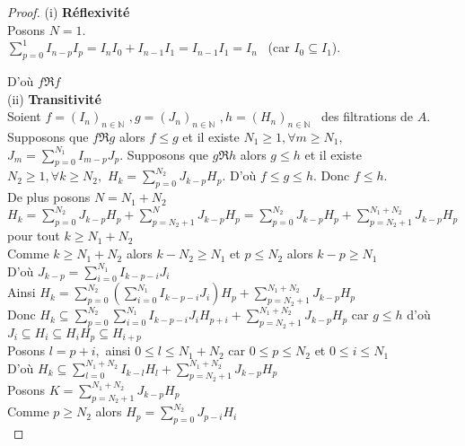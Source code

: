 \begin{proof}
	(i) \textbf{Réflexivité} \\
	Posons $N=1$. \\
	$\displaystyle \sum_{p=0}^{1}I_{n-p}I_{p}=I_{n}I_{0}+I_{n-1}I_{1}=I_{n-1}I_{1}=I_{n}$ \
	(car $I_{0}\subseteq I_{1}$).
	
	D'où $f \Re f$ \\
	(ii) \textbf{Transitivité} \\
	Soient $f=(I_{n})_{n\in \mathbb{N}}$ $,g=(J_{n})_{n\in \mathbb{N}}$ $,h=(H_{n})_{n\in \mathbb{N}}$ \ des filtrations de $A.$ \\
	Supposons que $f \Re g$
	alors $f\leq g$ et il existe $N_{1}\geq 1,\forall m\geq N_{1},$ $J_{m}=\displaystyle  \sum_{p=0}^{N_{1}}I_{m-p}J_{p}$.
	Supposons que $g \Re h$ alors $g\leq h$ et il existe $N_{2}\geq 1,\forall k\geq N_{2},$ $H_{k}=\displaystyle  \sum_{p=0}^{N_{2}}J_{k-p}H_{p}$.
	D'où $f\leq g\leq h.$ Donc $f\leq h$. \\
	De plus posons $N=N_{1}+N_{2}$ \\
	$H_{k}=\displaystyle  \sum_{p=0}^{N_{2}}J_{k-p}H_{p}+\displaystyle  \sum_{p=N_{2}+1}^{N}J_{k-p}H_{p}=\displaystyle  \sum_{p=0}^{N_{2}}J_{k-p}H_{p}+\displaystyle  \sum_{p=N_{2}+1}^{N_{1}+N_{2}}J_{k-p}H_{p}$ pour tout $k\geq N_{1}+N_{2}$ \\
	Comme $k\geq N_{1}+N_{2}$ alors $k-N_{2}\geq N_{1}$ et $p\leq N_{2}$ alors $k-p\geq N_{1}$ \\
	D'où $J_{k-p}=\displaystyle  \sum_{i=0}^{N_{1}}I_{k-p-i}J_{i}$ \\
	Ainsi $H_{k}=\displaystyle  \sum_{p=0}^{N_{2}}(\displaystyle  \sum_{i=0}^{N_{1}}I_{k-p-i}J_{i})H_{p}+\displaystyle  \sum_{p=N_{2}+1}^{N_{1}+N_{2}}J_{k-p}H_{p}$ \\
	Donc $H_{k}\subseteq \displaystyle  \sum_{p=0}^{N_{2}}\displaystyle  \sum_{i=0}^{N_{1}}I_{k-p-i}J_{i}H_{p+i}+\displaystyle  \sum_{p=N_{2}+1}^{N_{1}+N_{2}}J_{k-p}H_{p}$  car $g\leq h$ d'où $ J_{i}\subseteq H_{i}\subseteq H_{i}H_{p}\subseteq H_{i+p}$ \\
	Posons $l=p+i,$ ainsi $0\leq l\leq N_{1}+N_{2}$ car $0\leq p\leq N_{2}$ et $ 0\leq i\leq N_{1}$ \\
	D'où $H_{k}\subseteq \displaystyle  \sum_{l=0}^{N_{1}+N_{2}}I_{k-l}H_{l}+\displaystyle  \sum_{p=N_{2}+1}^{N_{1}+N_{2}}J_{k-p}H_{p}$ \\
	Posons $K=\displaystyle  \sum_{p=N_{2}+1}^{N_{1}+N_{2}}J_{k-p}H_{p}$ \\
	Comme $p\geq N_{2}$ alors $H_{p}=\displaystyle  \sum_{p=0}^{N_{2}}J_{p-i}H_{i}$ \\

\end{proof}
